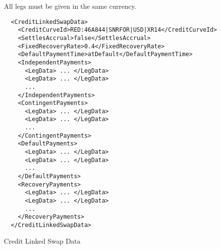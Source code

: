 All legs must be given in the same currency.

\begin{listing}[H]
\begin{verbatim}
  <CreditLinkedSwapData>
    <CreditCurveId>RED:46A844|SNRFOR|USD|XR14</CreditCurveId>
    <SettlesAccrual>false</SettlesAccrual>
    <FixedRecoveryRate>0.4</FixedRecoveryRate>
    <DefaultPaymentTime>atDefault</DefaultPaymentTime>
    <IndependentPayments>
      <LegData> ... </LegData>
      <LegData> ... </LegData>
      ...
    </IndependentPayments>
    <ContingentPayments>
      <LegData> ... </LegData>
      <LegData> ... </LegData>
      ...
    </ContingentPayments>
    <DefaultPayments>
      <LegData> ... </LegData>
      <LegData> ... </LegData>
      ...
    </DefaultPayments>
    <RecoveryPayments>
      <LegData> ... </LegData>
      <LegData> ... </LegData>
      ...
    </RecoveryPayments>
  </CreditLinkedSwapData>
\end{verbatim}
\caption{Credit Linked Swap Data}
\label{lst:creditlinkedswap}
\end{listing}
